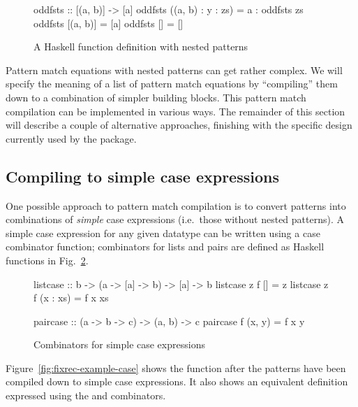 \begin{figure}
\begin{hscode}
oddfsts :: [(a, b)] -> [a]
oddfsts ((a, b) : y : zs) = a : oddfsts zs
oddfsts [(a, b)] = [a]
oddfsts [] = []
\end{hscode}
\caption{A Haskell function definition with nested patterns}
\label{fig:fixrec-example-function}
\end{figure}

Pattern match equations with nested patterns can get rather complex. We will specify the meaning of a list of pattern match equations by ``compiling'' them down to a combination of simpler building blocks. This pattern match compilation can be implemented in various ways. The remainder of this section will describe a couple of alternative approaches, finishing with the specific design currently used by the {\fixrec} package.

\subsection{Compiling to simple case expressions}

One possible approach to pattern match compilation is to convert patterns into combinations of \emph{simple} case expressions (i.e.~those without nested patterns). A simple case expression for any given datatype can be written using a case combinator function; combinators for lists and pairs are defined as Haskell functions in Fig.~\ref{fig:case-combinators}.

\begin{figure}
\begin{hscode}
listcase :: b -> (a -> [a] -> b) -> [a] -> b
listcase z f [] = z
listcase z f (x : xs) = f x xs
\end{hscode}
\begin{hscode}
paircase :: (a -> b -> c) -> (a, b) -> c
paircase f (x, y) = f x y
\end{hscode}
\caption{Combinators for simple case expressions}
\label{fig:case-combinators}
\end{figure}

Figure~\ref{fig:fixrec-example-case} shows the function  after the patterns have been compiled down to simple case expressions. It also shows an equivalent definition expressed using the  and  combinators.

